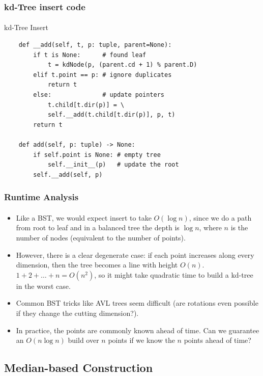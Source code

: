 \documentclass{beamer}                             %
\begin{document}
\begin{frame}[fragile]
\frametitle{kd-Tree insert code}
\framesubtitle{}
\begin{algorithm}[H]
  \caption{kd-Tree Insert}
  \begin{verbatim}
    def __add(self, t, p: tuple, parent=None):
        if t is None:      # found leaf
            t = kdNode(p, (parent.cd + 1) % parent.D)
        elif t.point == p: # ignore duplicates
            return t
        else:              # update pointers
            t.child[t.dir(p)] = \
            self.__add(t.child[t.dir(p)], p, t)
        return t

    def add(self, p: tuple) -> None:
        if self.point is None: # empty tree
            self.__init__(p)   # update the root
        self.__add(self, p)
  \end{verbatim}
\end{algorithm}
\end{frame}

\begin{frame}
\frametitle{Runtime Analysis}
\framesubtitle{}
\begin{itemize}[<+->]
  \item Like a BST, we would expect insert to take \( O(\log n) \), since we do
    a path from root to leaf and in a balanced tree the depth is \( \log n \),
    where \( n \) is the number of nodes (equivalent to the number of points).
  \item However, there is a clear degenerate case: if each point increases
    along every dimension, then the tree becomes a line with height \( O(n) \).
    \( 1 + 2 + \dots + n = O(n^2) \), so it might take quadratic time to build
    a kd-tree in the worst case.
  \item Common BST tricks like AVL trees seem difficult (are
    rotations even possible if they change the cutting dimension?).
  \item In practice, the points are commonly known ahead of
    time. Can we guarantee an \( O(n \log n) \) build over \( n \)
    points if we know the \( n \) points ahead of time?
\end{itemize}
\end{frame}

\subsection{Median-based Construction}
\end{document}
